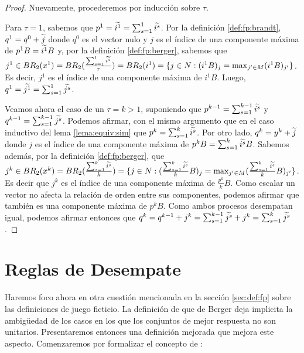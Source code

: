 \begin{proof}
    Nuevamente, procederemos por inducción sobre $\tau$.

    Para $\tau = 1$, sabemos que $p^1 = \widetilde{i^1} = \sum_{s=1}^1{\widetilde{i^s}}$. Por la definición \ref{def:fp:brandt}, $q^1 = q^0 + \widetilde{j}$ donde $q^0$ es el vector nulo y $j$ es el índice de una componente máxima de $p^{1}B = \widetilde{i^1}B$ y, por la definición \ref{def:fp:berger}, sabemos que $j^1 \in BR_2(x^1) = BR_2(\frac{\sum^1_{s=1} \widetilde{i^s}}{\tau}) = BR_2(i^1) = \{j \in N : (i^{1}B)_j = \max_{j' \in M} (i^{1}B)_{j'}\}$. Es decir, $j^1$ es el índice de una componente máxima de $i^{1}B$. Luego, $q^1 = \widetilde{j^1} = \sum_{s=1}^1{\widetilde{j^s}}$.

    Veamos ahora el caso de un $\tau = k > 1$, suponiendo que $p^{k-1} = \sum_{s=1}^{k-1}{\widetilde{i^s}}$ y $q^{k-1} = \sum_{s=1}^{k-1}{\widetilde{j^s}}$. Podemos afirmar, con el mismo argumento que en el caso inductivo del lema \ref{lema:equiv:sim} que $p^{k} = \sum_{s=1}^k{\widetilde{i^s}}$. Por otro lado, $q^{k} = y^{k} + \widetilde{j}$ donde $j$ es el índice de una componente máxima de $p^{k}B = \sum_{s=1}^k{\widetilde{i^s}}B$. Sabemos además, por la definición \ref{def:fp:berger}, que $j^k \in BR_2(x^{k}) = BR_2(\frac{\sum_{s=1}^{k}{\widetilde{i^s}}}{k}) = \{j \in N : (\frac{\sum_{s=1}^{k}{\widetilde{i^s}}}{k}B)_j = \max_{j' \in M} (\frac{\sum_{s=1}^{k}{\widetilde{i^s}}}{k}B)_{j'}\}$. Es decir que $j^k$ es el índice de una componente máxima de $\frac{p^k}{k}B$. Como escalar un vector no afecta la relación de orden entre sus componentes, podemos afirmar que también es una componente máxima de $p^{k}B$. Como ambos procesos desempatan igual, podemos afirmar entonces que $q^k = q^{k-1} + j^k = \sum_{s=1}^{k-1}{\widetilde{j^s}} + j^k = \sum_{s=1}^{k}{\widetilde{j^s}}$.

\end{proof}

\section{Reglas de Desempate}

Haremos foco ahora en otra cuestión mencionada en la sección \ref{sec:def:fp} sobre las definiciones de juego ficticio. La definición de que de Berger deja implicita la ambigüedad de los casos en los que los conjuntos de mejor respuesta no son unitarios. Presentaremos entonces una definición mejorada que mejora este aspecto. Comenzaremos por formalizar el concepto de :

